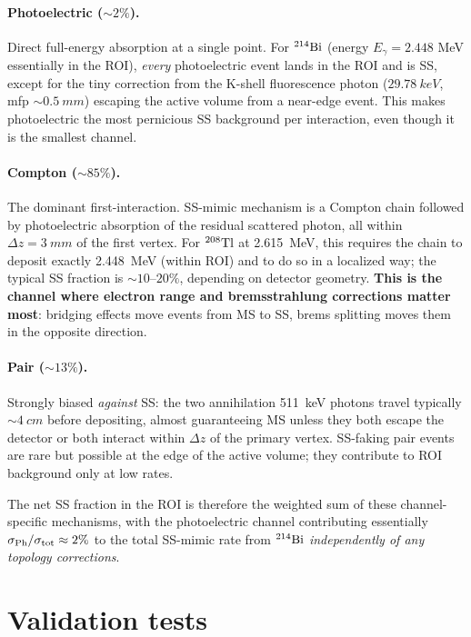 \documentclass[11pt,a4paper]{article}
\newcommand{\Eg}{E_\gamma}
\begin{document}
\paragraph{Photoelectric ($\sim 2\%$).} Direct full-energy
absorption at a single point. For $\rm{}^{214}Bi$ (energy
$\Eg=2.448$ MeV essentially in the ROI), \emph{every} photoelectric
event lands in the ROI and is SS, except for the tiny correction
from the K-shell fluorescence photon ($\SI{29.78}{keV}$, mfp
$\sim\!\SI{0.5}{mm}$) escaping the active volume from a near-edge
event. This makes photoelectric the most pernicious SS
background per interaction, even though it is the smallest
channel.

\paragraph{Compton ($\sim 85\%$).} The dominant first-interaction.
SS-mimic mechanism is a Compton chain followed by photoelectric
absorption of the residual scattered photon, all within $\Delta
z=\SI{3}{mm}$ of the first vertex. For $\rm{}^{208}Tl$ at
\SI{2.615}{MeV}, this requires the chain to deposit exactly
\SI{2.448}{MeV} (within ROI) and to do so in a localized way; the
typical SS fraction is $\sim 10$--$20\%$, depending on detector
geometry. \textbf{This is the channel where electron range and
bremsstrahlung corrections matter most}: bridging effects move
events from MS to SS, brems splitting moves them in the opposite
direction.

\paragraph{Pair ($\sim 13\%$).} Strongly biased \emph{against} SS:
the two annihilation \SI{511}{keV} photons travel typically
$\sim\!\SI{4}{cm}$ before depositing, almost guaranteeing MS
unless they both escape the detector or both interact within
$\Delta z$ of the primary vertex. SS-faking pair events are
rare but possible at the edge of the active volume; they
contribute to ROI background only at low rates.

The net SS fraction in the ROI is therefore the weighted sum
of these channel-specific mechanisms, with the photoelectric
channel contributing essentially $\sigma_{\rm Ph}/\sigma_{\rm tot}
\approx 2\%$ to the total SS-mimic rate from $\rm{}^{214}Bi$
\emph{independently of any topology corrections}.

\section{Validation tests}\label{sec:validation}
\end{document}
